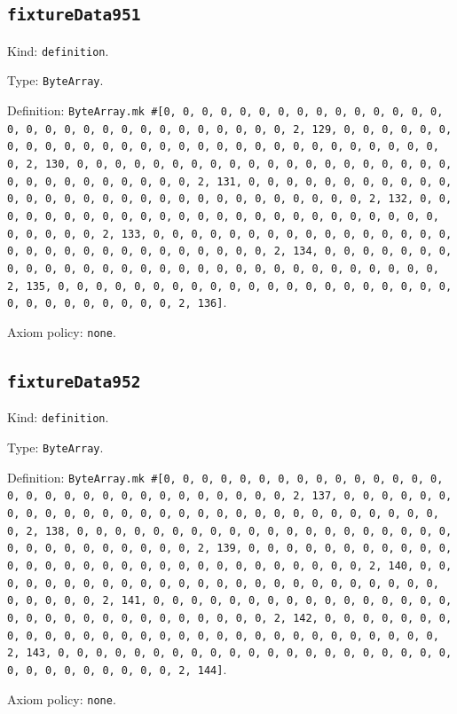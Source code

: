 \documentclass[11pt]{article}
\begin{document}
\subsection*{\texttt{fixtureData951}}
\noindent Kind: \texttt{definition}.\par
\noindent Type: \texttt{ByteArray}.\par
\noindent Definition: \texttt{ByteArray.mk \#[0, 0, 0, 0, 0, 0, 0, 0, 0, 0, 0, 0, 0, 0, 0, 0, 0, 0, 0, 0, 0, 0, 0, 0, 0, 0, 0, 0, 0, 0, 2, 129, 0, 0, 0, 0, 0, 0, 0, 0, 0, 0, 0, 0, 0, 0, 0, 0, 0, 0, 0, 0, 0, 0, 0, 0, 0, 0, 0, 0, 0, 0, 2, 130, 0, 0, 0, 0, 0, 0, 0, 0, 0, 0, 0, 0, 0, 0, 0, 0, 0, 0, 0, 0, 0, 0, 0, 0, 0, 0, 0, 0, 0, 0, 2, 131, 0, 0, 0, 0, 0, 0, 0, 0, 0, 0, 0, 0, 0, 0, 0, 0, 0, 0, 0, 0, 0, 0, 0, 0, 0, 0, 0, 0, 0, 0, 2, 132, 0, 0, 0, 0, 0, 0, 0, 0, 0, 0, 0, 0, 0, 0, 0, 0, 0, 0, 0, 0, 0, 0, 0, 0, 0, 0, 0, 0, 0, 0, 2, 133, 0, 0, 0, 0, 0, 0, 0, 0, 0, 0, 0, 0, 0, 0, 0, 0, 0, 0, 0, 0, 0, 0, 0, 0, 0, 0, 0, 0, 0, 0, 2, 134, 0, 0, 0, 0, 0, 0, 0, 0, 0, 0, 0, 0, 0, 0, 0, 0, 0, 0, 0, 0, 0, 0, 0, 0, 0, 0, 0, 0, 0, 0, 2, 135, 0, 0, 0, 0, 0, 0, 0, 0, 0, 0, 0, 0, 0, 0, 0, 0, 0, 0, 0, 0, 0, 0, 0, 0, 0, 0, 0, 0, 0, 0, 2, 136]}.\par
\noindent Axiom policy: \texttt{none}.\par
\subsection*{\texttt{fixtureData952}}
\noindent Kind: \texttt{definition}.\par
\noindent Type: \texttt{ByteArray}.\par
\noindent Definition: \texttt{ByteArray.mk \#[0, 0, 0, 0, 0, 0, 0, 0, 0, 0, 0, 0, 0, 0, 0, 0, 0, 0, 0, 0, 0, 0, 0, 0, 0, 0, 0, 0, 0, 0, 2, 137, 0, 0, 0, 0, 0, 0, 0, 0, 0, 0, 0, 0, 0, 0, 0, 0, 0, 0, 0, 0, 0, 0, 0, 0, 0, 0, 0, 0, 0, 0, 2, 138, 0, 0, 0, 0, 0, 0, 0, 0, 0, 0, 0, 0, 0, 0, 0, 0, 0, 0, 0, 0, 0, 0, 0, 0, 0, 0, 0, 0, 0, 0, 2, 139, 0, 0, 0, 0, 0, 0, 0, 0, 0, 0, 0, 0, 0, 0, 0, 0, 0, 0, 0, 0, 0, 0, 0, 0, 0, 0, 0, 0, 0, 0, 2, 140, 0, 0, 0, 0, 0, 0, 0, 0, 0, 0, 0, 0, 0, 0, 0, 0, 0, 0, 0, 0, 0, 0, 0, 0, 0, 0, 0, 0, 0, 0, 2, 141, 0, 0, 0, 0, 0, 0, 0, 0, 0, 0, 0, 0, 0, 0, 0, 0, 0, 0, 0, 0, 0, 0, 0, 0, 0, 0, 0, 0, 0, 0, 2, 142, 0, 0, 0, 0, 0, 0, 0, 0, 0, 0, 0, 0, 0, 0, 0, 0, 0, 0, 0, 0, 0, 0, 0, 0, 0, 0, 0, 0, 0, 0, 2, 143, 0, 0, 0, 0, 0, 0, 0, 0, 0, 0, 0, 0, 0, 0, 0, 0, 0, 0, 0, 0, 0, 0, 0, 0, 0, 0, 0, 0, 0, 0, 2, 144]}.\par
\noindent Axiom policy: \texttt{none}.\par
\end{document}
